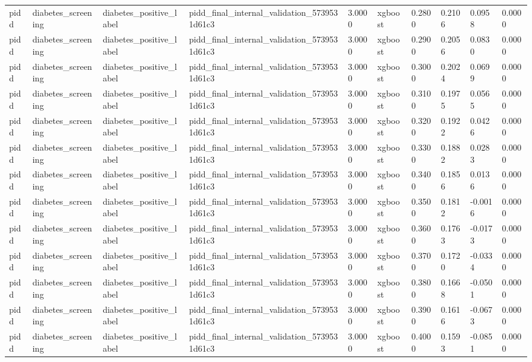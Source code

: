 \begin{tabular}{llllllllll}
pidd & diabetes\_screening & diabetes\_positive\_label & pidd\_final\_internal\_validation\_5739531d61c3 & 3.0000 & xgboost & 0.2800 & 0.2106 & 0.0958 & 0.0000 \\
pidd & diabetes\_screening & diabetes\_positive\_label & pidd\_final\_internal\_validation\_5739531d61c3 & 3.0000 & xgboost & 0.2900 & 0.2056 & 0.0830 & 0.0000 \\
pidd & diabetes\_screening & diabetes\_positive\_label & pidd\_final\_internal\_validation\_5739531d61c3 & 3.0000 & xgboost & 0.3000 & 0.2024 & 0.0699 & 0.0000 \\
pidd & diabetes\_screening & diabetes\_positive\_label & pidd\_final\_internal\_validation\_5739531d61c3 & 3.0000 & xgboost & 0.3100 & 0.1975 & 0.0565 & 0.0000 \\
pidd & diabetes\_screening & diabetes\_positive\_label & pidd\_final\_internal\_validation\_5739531d61c3 & 3.0000 & xgboost & 0.3200 & 0.1922 & 0.0426 & 0.0000 \\
pidd & diabetes\_screening & diabetes\_positive\_label & pidd\_final\_internal\_validation\_5739531d61c3 & 3.0000 & xgboost & 0.3300 & 0.1882 & 0.0283 & 0.0000 \\
pidd & diabetes\_screening & diabetes\_positive\_label & pidd\_final\_internal\_validation\_5739531d61c3 & 3.0000 & xgboost & 0.3400 & 0.1856 & 0.0136 & 0.0000 \\
pidd & diabetes\_screening & diabetes\_positive\_label & pidd\_final\_internal\_validation\_5739531d61c3 & 3.0000 & xgboost & 0.3500 & 0.1812 & -0.0016 & 0.0000 \\
pidd & diabetes\_screening & diabetes\_positive\_label & pidd\_final\_internal\_validation\_5739531d61c3 & 3.0000 & xgboost & 0.3600 & 0.1763 & -0.0173 & 0.0000 \\
pidd & diabetes\_screening & diabetes\_positive\_label & pidd\_final\_internal\_validation\_5739531d61c3 & 3.0000 & xgboost & 0.3700 & 0.1720 & -0.0334 & 0.0000 \\
pidd & diabetes\_screening & diabetes\_positive\_label & pidd\_final\_internal\_validation\_5739531d61c3 & 3.0000 & xgboost & 0.3800 & 0.1668 & -0.0501 & 0.0000 \\
pidd & diabetes\_screening & diabetes\_positive\_label & pidd\_final\_internal\_validation\_5739531d61c3 & 3.0000 & xgboost & 0.3900 & 0.1616 & -0.0673 & 0.0000 \\
pidd & diabetes\_screening & diabetes\_positive\_label & pidd\_final\_internal\_validation\_5739531d61c3 & 3.0000 & xgboost & 0.4000 & 0.1593 & -0.0851 & 0.0000 \\

\end{tabular}
